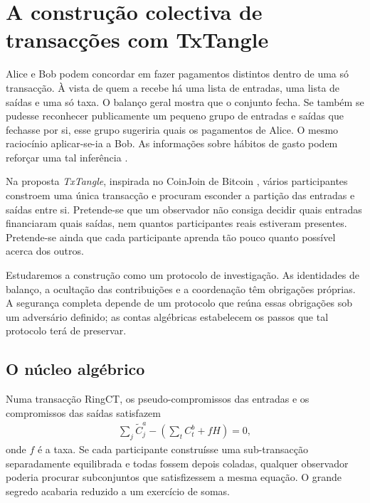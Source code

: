 \chapter{A construção colectiva de transacções com TxTangle}
\label{chapter:txtangle}

Alice e Bob podem concordar em fazer pagamentos distintos dentro de
uma só transacção. À vista de quem a recebe há uma lista de entradas,
uma lista de saídas e uma só taxa. O balanço geral mostra que o
conjunto fecha. Se também se pudesse reconhecer publicamente um
pequeno grupo de entradas e saídas que fechasse por si, esse grupo
sugeriria quais os pagamentos de Alice. O mesmo raciocínio aplicar-se-ia
a Bob. As informações sobre hábitos de gasto podem reforçar uma tal
inferência \cite{AnalysisOfLinkability}.

Na proposta \emph{TxTangle}, inspirada no CoinJoin de
Bitcoin \cite{coinjoin-wiki}, vários participantes constroem uma única
transacção e procuram esconder a partição das entradas e saídas entre si.
Pretende-se que um observador não consiga decidir quais entradas financiaram
quais saídas, nem quantos participantes reais estiveram presentes. Pretende-se
ainda que cada participante aprenda tão pouco quanto possível acerca dos
outros.

Estudaremos a construção como um protocolo de investigação. As identidades
de balanço, a ocultação das contribuições e a coordenação têm obrigações
próprias. A segurança completa depende de um protocolo que reúna essas
obrigações sob um adversário definido; as contas algébricas estabelecem os
passos que tal protocolo terá de preservar.

\section{O núcleo algébrico}
\label{sec:building-txtangle}

Numa transacção RingCT, os pseudo-compromissos das entradas e os compromissos
das saídas satisfazem
\begin{align}
 \sum_j \widetilde C^a_j-
 \left(\sum_t C^b_t+fH\right)=0,
 \label{eq:txtangle-global-balance}
\end{align}
onde \(f\) é a taxa. Se cada participante construísse uma sub-transacção
separadamente equilibrada e todas fossem depois coladas, qualquer observador
poderia procurar subconjuntos que satisfizessem a mesma equação. O grande
segredo acabaria reduzido a um exercício de somas.

